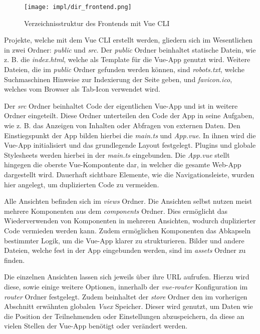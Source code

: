 \begin{figure}[htpb]
    \centering
    \texttt{[image: impl/dir\_frontend.png]}
    \caption{Verzeichnisstruktur des Frontends mit Vue CLI}
    \label{fig:impl-frontend-vuecli-dir}
\end{figure}

Projekte, welche mit dem Vue CLI erstellt werden, gliedern sich im Wesentlichen
in zwei Ordner: \textit{public} und \textit{src}. Der \textit{public} Ordner
beinhaltet statische Datein, wie z. B. die \textit{index.html}, welche als
Template für die Vue-App genutzt wird. Weitere Dateien, die im \textit{public}
Ordner gefunden werden können, sind \textit{robots.txt}, welche
Suchmaschinen Hinweise zur Indexierung der Seite geben, und
\textit{favicon.ico}, welches vom Browser als Tab-Icon verwendet wird.

Der \textit{src} Ordner beinhaltet Code der eigentlichen Vue-App und ist in
weitere Ordner eingeteilt. Diese Ordner unterteilen den Code der App in seine
Aufgaben, wie z. B. das Anzeigen von Inhalten oder Abfragen von externen Daten.
Den Einstiegspunkt der App bilden hierbei die \textit{main.ts} und
\textit{App.vue}. In ihnen wird die Vue-App initialisiert und das grundlegende
Layout festgelegt. Plugins und globale Stylesheets werden hierbei in der
\textit{main.ts} eingebunden. Die \textit{App.vue} stellt hingegen die oberste
Vue-Kompontente dar, in welcher die gesamte Web-App dargestellt wird. Dauerhaft
sichtbare Elemente, wie die Navigationsleiste, wurden hier angelegt, um
duplizierten Code zu vermeiden.

Alle Ansichten befinden sich im \textit{views} Ordner. Die Ansichten selbst
nutzen meist mehrere Komponenten aus dem \textit{components} Ordner. Dies
ermöglicht das Wiederverwenden von Komponenten in mehreren Ansichten, wodurch
duplizierter Code vermieden werden kann. Zudem ermöglichen Komponenten das
Abkapseln bestimmter Logik, um die Vue-App klarer zu strukturieren. Bilder und
andere Dateien, welche fest in der App eingebunden werden, sind im
\textit{assets} Ordner zu finden.

Die einzelnen Ansichten lassen sich jeweils über ihre URL aufrufen. Hierzu wird
diese, sowie einige weitere Optionen, innerhalb der \textit{vue-router}
Konfiguration im \textit{router} Ordner festgelegt. Zudem beinhaltet der
\textit{store} Ordner den im vorherigen Abschnitt erwähnten globalen
\textit{Vuex} Speicher. Dieser wird genutzt, um Daten wie die Position der
Teilnehmenden oder Einstellungen abzuspeichern, da diese an vielen Stellen der
Vue-App benötigt oder verändert werden.

